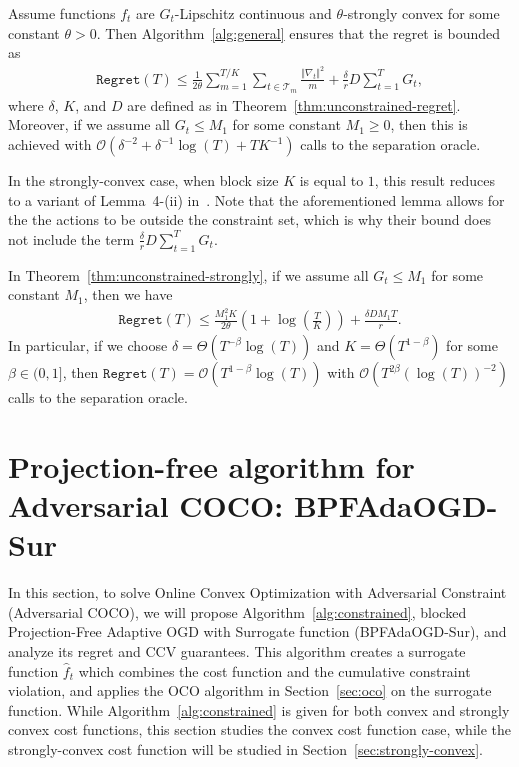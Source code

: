 \documentclass[twoside,11pt,]{article}
\newcommand{\op}[1]{\operatorname{#1}}
\newcommand{\C}[1]{\mathcal{#1}}
\newcommand{\hf}{\hat{f}}
\newcommand{\normdt}{\Vert \nabla_t \Vert}
\newcommand{\sumT}{\sum\limits_{t=1}^T}
\renewcommand{\cite}[1]{\citep{#1}}
\begin{document}
\begin{theorem}
\label{thm:unconstrained-strongly}
Assume functions $f_t$ are $G_t$-Lipschitz continuous and $\theta$-strongly convex for some constant $\theta > 0$. Then Algorithm~\ref{alg:general} ensures that the regret is bounded as
\begin{align*}
\mathtt{Regret}(T) \leq \frac{1}{2 \theta} \sum\limits_{m=1}^{T/K} \sum\limits_{t\in\C{T}_m} \frac{\normdt^2}{m} + \frac{\delta }{r} D \sumT G_t,
\end{align*}
where $\delta$, $K$, and $D$ are defined as in Theorem~\ref{thm:unconstrained-regret}.
Moreover, if we assume all $G_t \leq M_1$ for some constant $M_1 \geq 0$, then
this is achieved with $\C{O}\left( \delta^{-2} + \delta^{-1}\log(T) + T K^{-1} \right)$ calls to the separation oracle.
\end{theorem}

In the strongly-convex case, when block size $K$ is equal to $1$, this result reduces to a variant of Lemma~4-(ii) in~\cite{garber2022new}.
Note that the aforementioned lemma allows for the the actions to be outside the constraint set, which is why their bound does not include the term $\frac{\delta }{r} D \sumT G_t$.

\begin{corollary}
\label{cor:strcon}
    In Theorem~\ref{thm:unconstrained-strongly}, if we assume all $G_t\leq M_1$ for some constant $M_1$, then we have
    \begin{align*}
    \mathtt{Regret}(T) 
    \leq  \frac{M_1^2 K}{2 \theta} (1+\log(\frac{T}{K})) + \frac{\delta D M_1 T}{r}.
    \end{align*}
    In particular, if we choose $\delta=\Theta(T^{-\beta}\op{log}(T))$ and $K=\Theta(T^{1-\beta})$ for some $\beta \in (0, 1]$, then $\mathtt{Regret}(T)= \C{O}(T^{1-\beta}\log(T))$
    with $\C{O}(T^{2\beta}(\log(T))^{-2})$ calls to the separation oracle.
\end{corollary}



\section{Projection-free algorithm for Adversarial COCO: BPFAdaOGD-Sur}\label{sec:pacogd}

In this section, to solve Online Convex Optimization with Adversarial Constraint (Adversarial COCO), we will propose Algorithm~\ref{alg:constrained}, blocked Projection-Free Adaptive OGD with Surrogate function (BPFAdaOGD-Sur), and analyze its regret and CCV guarantees. 
This algorithm creates a surrogate function $\hf_t$ which combines the cost function and the cumulative constraint violation, and applies the OCO algorithm in Section~\ref{sec:oco} on the surrogate function. While Algorithm~\ref{alg:constrained} is given for both convex and strongly convex cost functions, this section studies the convex cost function case, while the strongly-convex cost function will be studied in Section~\ref{sec:strongly-convex}. 
\end{document}
